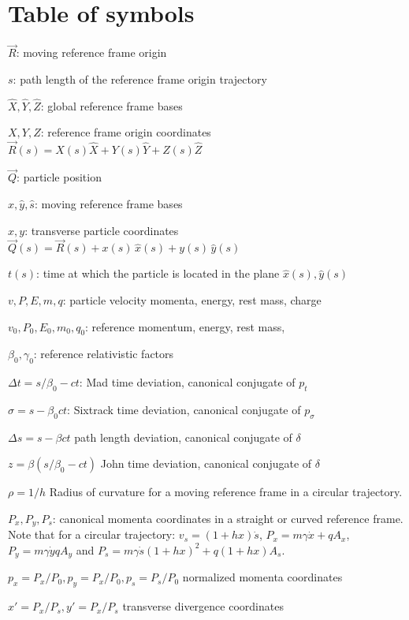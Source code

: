\documentclass[english]{article}
\begin{document}
\section{Table of symbols}

\begin{description}
\item $\vec R$: moving reference frame origin
\item $s$: path length of the reference frame origin trajectory
\item $\hat X, \hat Y,\hat Z$: global reference frame bases
\item $X, Y, Z$: reference frame origin coordinates $\vec R(s)=X(s) \hat X+Y(s) \hat Y+ Z(s) \hat Z$
\item $\vec Q$: particle position
\item $\hat x, \hat y, \hat s$: moving reference frame bases
\item $x, y$: transverse particle coordinates $\vec Q(s)= \vec R(s) + x(s) \,\hat x(s) + y(s)\, \hat y(s)$
\item $t(s)$: time at which the particle is located in the plane $\hat x(s), \hat y(s)$
\item $v, P, E, m, q$: particle velocity momenta, energy, rest mass, charge
\item $v_0, P_0, E_0, m_0, q_0$: reference momentum, energy, rest mass,
\item $\beta_0, \gamma_0$: reference relativistic factors
\item $\Delta t=s/\beta_0 - c t$: Mad time deviation, canonical conjugate of $p_t$
\item $\sigma=s - \beta_0 c t$: Sixtrack time deviation, canonical conjugate of $p_\sigma$
\item $\Delta s=s - \beta c t  $  path length deviation, canonical conjugate of $\delta$
\item $z=\beta(s/\beta_0 - c t) $  John time deviation, canonical conjugate of $\delta$
\item $\rho=1/h$ Radius of curvature for a moving reference frame in a circular trajectory. 
\item $P_x, P_y,  P_s$: canonical momenta coordinates in a straight or curved reference frame. Note that for a circular trajectory: $v_s= (1 +h x) \dot s$, $P_x=m \gamma \dot x + q A_x$, $P_y=m \gamma \dot y q A_y$ and 
$P_s=m \gamma \dot s (1 + h x)^2 + q (1 + h x) A_s$.
\item $p_x=P_x/P_0, p_y=P_x/P_0, p_s=P_s/P_0$ normalized momenta coordinates
\item $x'=P_x/P_s,y'=P_x/P_s$ transverse divergence coordinates

\end{description}
\end{document}
